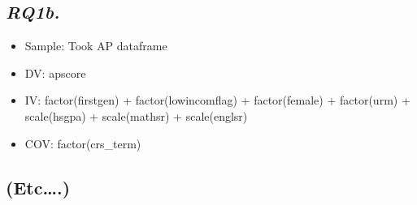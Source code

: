 \documentclass[]{article}
\providecommand{\tightlist}{%
  \setlength{\itemsep}{0pt}\setlength{\parskip}{0pt}}
\begin{document}
\subsection{\texorpdfstring{\emph{RQ1b.}}{RQ1b.}}\label{rq1b.}

\begin{itemize}
\tightlist
\item
  Sample: Took AP dataframe
\item
  DV: apscore
\item
  IV: factor(firstgen) + factor(lowincomflag) + factor(female) +
  factor(urm) + scale(hsgpa) + scale(mathsr) + scale(englsr)
\item
  COV: factor(crs\_term)
\end{itemize}

\subsection{(Etc\ldots{}.)}\label{etc.}
\end{document}
